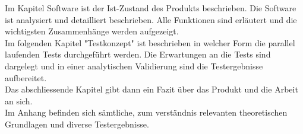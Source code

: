 Im Kapitel Software ist der Ist-Zustand des Produkts beschrieben. Die Software ist analysiert und detailliert beschrieben. Alle Funktionen sind erläutert und die wichtigsten Zusammenhänge werden aufgezeigt. \\Im folgenden Kapitel "Testkonzept" ist beschrieben in welcher Form die parallel laufenden Tests durchgeführt werden. Die Erwartungen an die Tests sind dargelegt und in einer analytischen Validierung sind die Testergebnisse aufbereitet. \\Das abschliessende Kapitel gibt dann ein Fazit über das Produkt und die Arbeit an sich. \\Im Anhang befinden sich sämtliche, zum verständnis relevanten theoretischen Grundlagen und diverse Testergebnisse.\\



